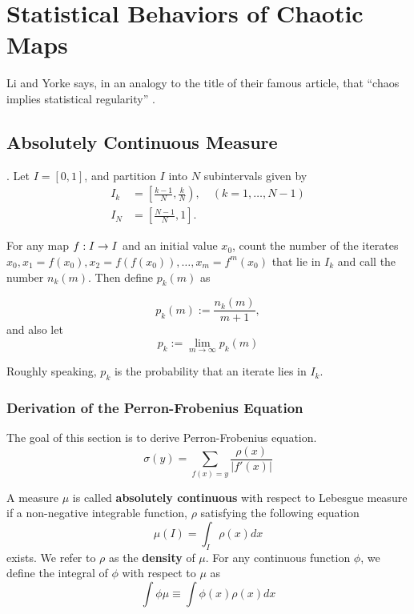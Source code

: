 \documentclass[12pt,twoside]{book}
\begin{document}
\chapter{Statistical Behaviors of Chaotic Maps}
Li and Yorke says, in an analogy to the title of their famous article, that ``chaos implies statistical regularity'' \citep[Exploring Chaos on an Interval]{ueda-abraham}.

\section{Absolutely Continuous Measure}
\citet{sternberg}.
Let $I = [0,1]$, and partition $I$ into $N$ subintervals given by
\begin{align*}
  I_k &= \left[\frac{k-1}{N}, \frac{k}{N} \right),\quad (k = 1, \ldots, N-1) \\
    I_N &= \left[\frac{N-1}{N}, 1 \right].
\end{align*}

For any map $f: I \rightarrow I$ and an initial value $x_0$, count the number
of the iterates $x_0, x_1 = f(x_0), x_2 = f(f(x_0)), \ldots, x_m = f^m(x_0)$
that lie in $I_k$ and call the number $n_k(m)$. Then define $p_k(m)$ as

\begin{equation*}
  p_k(m) := \frac{n_k(m)}{m+1},
\end{equation*}
and also let
\begin{equation*}
  p_k := \lim_{m \to \infty} p_k(m)
\end{equation*}

Roughly speaking, $p_k$ is the probability that an iterate lies in $I_k$.

\subsection{Derivation of the Perron-Frobenius Equation}
The goal of this section is to derive Perron-Frobenius equation.
\begin{equation}
  \sigma(y) = \sum\limits_{f(x) = y} \frac{\rho(x)}{|f'(x)|}
  \label{pfeqn}
\end{equation}

A measure $\mu$ is called \textbf{absolutely continuous} with respect to Lebesgue measure if a non-negative integrable function, $\rho$ satisfying the following equation
\begin{equation*}
  \mu(I) = \int_I \rho(x) dx
\end{equation*}
exists.
We refer to $\rho$ as the \textbf{density} of $\mu$. 
For any continuous function $\phi$, we define the integral of $\phi$ with respect to $\mu$ as
\begin{equation*}
  \int \phi\mu \equiv \int \phi(x)\rho(x)dx  
\end{equation*}
\end{document}
